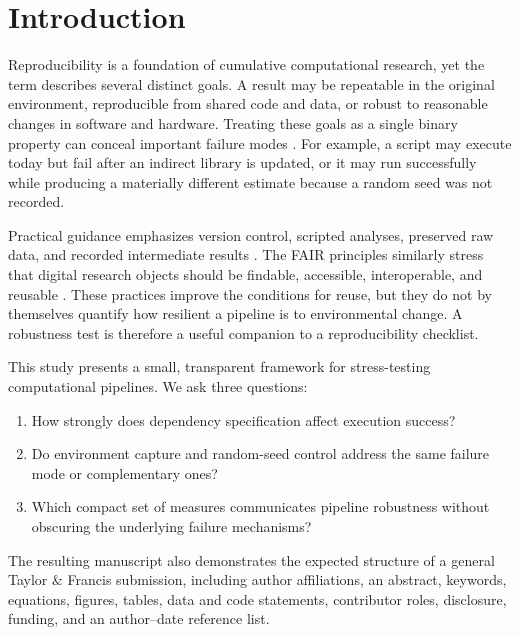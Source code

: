\section{Introduction}

Reproducibility is a foundation of cumulative computational research, yet the
term describes several distinct goals. A result may be repeatable in the
original environment, reproducible from shared code and data, or robust to
reasonable changes in software and hardware. Treating these goals as a single
binary property can conceal important failure modes \citep{peng2011,stodden2016}.
For example, a script may execute today but fail after an indirect library is
updated, or it may run successfully while producing a materially different
estimate because a random seed was not recorded.

Practical guidance emphasizes version control, scripted analyses, preserved raw
data, and recorded intermediate results \citep{sandve2013}. The FAIR principles
similarly stress that digital research objects should be findable, accessible,
interoperable, and reusable \citep{wilkinson2016}. These practices improve the
conditions for reuse, but they do not by themselves quantify how resilient a
pipeline is to environmental change. A robustness test is therefore a useful
companion to a reproducibility checklist.

This study presents a small, transparent framework for stress-testing
computational pipelines. We ask three questions:

\begin{enumerate}
  \item How strongly does dependency specification affect execution success?
  \item Do environment capture and random-seed control address the same failure
        mode or complementary ones?
  \item Which compact set of measures communicates pipeline robustness without
        obscuring the underlying failure mechanisms?
\end{enumerate}

The resulting manuscript also demonstrates the expected structure of a general
Taylor \& Francis submission, including author affiliations, an abstract,
keywords, equations, figures, tables, data and code statements, contributor
roles, disclosure, funding, and an author--date reference list.
